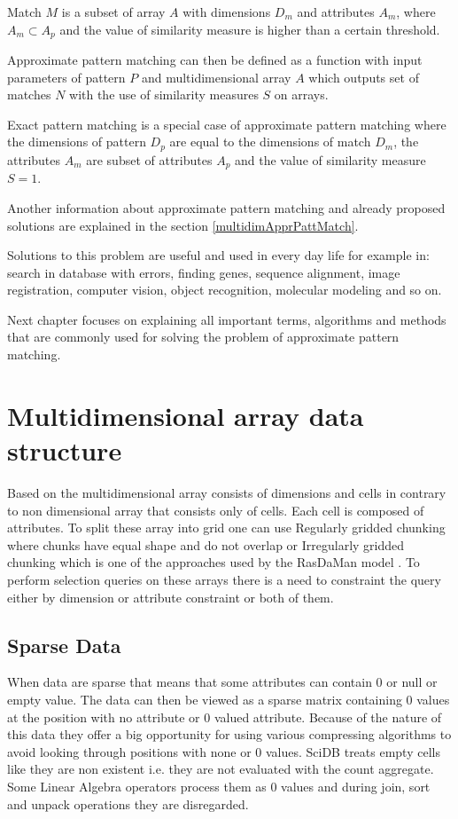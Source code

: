 Match $M$ is a subset of array $A$ with dimensions $D_m$ and attributes $A_m$, where $A_m \subset A_p$ and the value of similarity measure is higher than a certain threshold.

Approximate pattern matching can then be defined as a function with input parameters of pattern $P$ and multidimensional array $A$ which outputs set of matches $N$ with the use of similarity measures $S$ on arrays.

Exact pattern matching is a special case of approximate pattern matching where the dimensions of pattern $D_p$ are equal to the dimensions of match $D_m$, the attributes $A_m$ are subset of attributes $A_p$ and the value of similarity measure $S = 1$.

Another information about approximate pattern matching and already proposed solutions are explained in the section \ref{multidimApprPattMatch}.

Solutions to this problem are useful and used in every day life for example in: search in database with errors, finding genes, sequence alignment, image registration, computer vision, object recognition, molecular modeling and so on. 

Next chapter focuses on explaining all important terms, algorithms and methods that are commonly used for solving the problem of approximate pattern matching.


\section{Multidimensional array data structure}\label{multidimArrayDataStructure}
Based on \cite{samet} the multidimensional array consists of dimensions and cells in contrary to non dimensional array that consists only of cells. Each cell is composed of attributes. To split these array into grid one can use Regularly gridded chunking where chunks have equal shape and do not overlap or Irregularly gridded chunking which is one of the approaches used by the RasDaMan model \cite{rasdaman}.
To perform selection queries on these arrays there is a need to constraint the query either by dimension or attribute constraint or both of them.

\subsection{Sparse Data}
When data are sparse that means that some attributes can contain 0 or null or empty value. The data can then be viewed as a sparse matrix containing 0 values at the position with no attribute or 0 valued attribute. Because of the nature of this data they offer a big opportunity for using various compressing algorithms to avoid looking through positions with none or 0 values. SciDB \cite{scidb} treats empty cells like they are non existent i.e. they are not evaluated with the count aggregate. Some Linear Algebra operators process them as 0 values and during join, sort and unpack operations they are disregarded.

